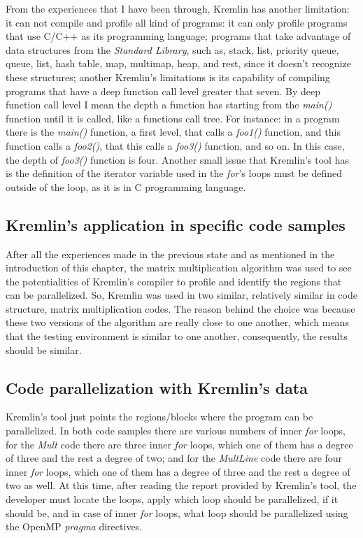 From the experiences that I have been through, Kremlin has another limitation: it can not compile and profile all kind of programs: it can only profile programs that use C/C++ as its programming language; programs that take advantage of data structures from the \textit{Standard Library}, such as, stack, list, priority queue, queue, list, hash table, map, multimap, heap, and rest, since it doesn't recognize these structures; another Kremlin's limitations is its capability of compiling programs that have a deep function call level greater that seven. By deep function call level I mean the depth a function has starting from the \textit{main()} function until it is called, like a functions call tree. For instance: in a program there is the \textit{main()} function, a first level, that calls a \textit{foo1()} function, and this function calls a \textit{foo2()}, that this calls a \textit{foo3()} function, and so on. In this case, the depth of \textit{foo3()} function is four. Another small issue that Kremlin's tool has is the definition of the iterator variable used in the \textit{for}'s loops must be defined outside of the loop, as it is in C programming language.


\subsection{Kremlin's application in specific code samples}

After all the experiences made in the previous state and as mentioned in the introduction of this chapter, the matrix multiplication algorithm was used to see the potentialities of Kremlin's compiler to profile and identify the regions that can be parallelized. So, Kremlin was used in two similar, relatively similar in code structure, matrix multiplication codes. The reason behind the choice was because these two versions of the algorithm are really close to one another, which means that the testing environment is similar to one another, consequently, the results should be similar. 

\subsection{Code parallelization with Kremlin's data}

Kremlin's tool just points the regions/blocks where the program can be parallelized. In both code samples there are various numbers of inner \textit{for} loops, for the \textit{Mult} code  there are three inner \textit{for} loops, which one of them has a degree of three and the rest a degree of two; and for the \textit{MultLine} code there are four inner \textit{for} loops, which one of them has a degree of three and the rest a degree of two as well. At this time, after reading the report provided by Kremlin's tool, the developer must locate the loops, apply which loop should be parallelized, if it should be, and in case of inner \textit{for} loops, what loop should be parallelized using the OpenMP \textit{pragma} directives.

